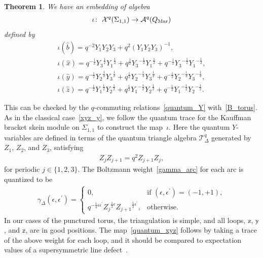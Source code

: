 \documentclass[10pt,a4paper]{amsart}
\numberwithin{equation}{section}
\newtheorem{Theorem}{Theorem}[section]
\begin{document}
\begin{Theorem} \label{thm:q_torus} We have an embedding of algebra
 \begin{gather*}
 \iota\colon \ \mathcal{X}^q(\Sigma_{1,1}) \to \mathcal{A}^q(Q_{\text{\rm Mar}})
 \end{gather*}
 defined by
 \begin{gather}
\iota(\hat{b}) = q^{-2} Y_1 Y_2 Y_3 + q^2 ( Y_1 Y_2 Y_3 )^{-1} ,\nonumber \\
 \iota(\hat{x}) = q^{-\frac{1}{2}} {Y_3}^{\frac{1}{2}} {Y_1}^{\frac{1}{2}} + q^{\frac{1}{2}} {Y_3}^{-\frac{1}{2}} {Y_1}^{\frac{1}{2}} + q^{-\frac{1}{2}} {Y_3}^{-\frac{1}{2}} {Y_1}^{-\frac{1}{2}} ,\nonumber \\
 \iota(\hat{y}) = q^{-\frac{1}{2}} {Y_2}^{\frac{1}{2}} {Y_3}^{\frac{1}{2}} + q^{\frac{1}{2}} {Y_2}^{-\frac{1}{2}} {Y_3}^{\frac{1}{2}} + q^{-\frac{1}{2}} {Y_2}^{-\frac{1}{2}} {Y_3}^{-\frac{1}{2}} ,\nonumber \\
 \iota(\hat{z}) = q^{-\frac{1}{2}} {Y_1}^{\frac{1}{2}} {Y_2}^{\frac{1}{2}} + q^{\frac{1}{2}} {Y_1}^{-\frac{1}{2}} {Y_2}^{\frac{1}{2}} + q^{-\frac{1}{2}} {Y_1}^{-\frac{1}{2}} {Y_2}^{-\frac{1}{2}} .\label{quantum_xyz}
 \end{gather}
\end{Theorem}

This can be checked by the $q$-commuting relations~\eqref{quantum_Y} with~\eqref{B_torus}. As in the classical case~\eqref{xyz_y}, we follow the quantum trace for the Kauffman bracket skein module on $\Sigma_{1,1}$ to construct the map~$\iota$. Here the quantum $Y$-variables are defined in terms of the quantum triangle algebra $\mathcal{T}^q_\Delta$ generated by $Z_1$, $Z_2$, and $Z_3$, satisfying
\begin{gather*}
 {Z}_j {Z}_{j+1} = q^2 {Z}_{j+1} {Z}_j ,
\end{gather*}
for periodic $j\in \{ 1, 2, 3 \}$. The Boltzmann weight~\eqref{gamma_arc} for each arc is quantized to be
\begin{gather*}
 \gamma_\Delta(\epsilon, \epsilon^\prime) =
 \begin{cases}
 0 , & \text{if $(\epsilon, \epsilon^\prime)=(-1, +1)$}, \\
 q^{-\frac{1}{4} \epsilon \epsilon^\prime} {Z_{ j}}^{\frac{1}{2}\epsilon} {Z_{ j+1}}^{\frac{1}{2}\epsilon^\prime}, & \text{otherwise}.
 \end{cases}
\end{gather*}
In our cases of the punctured torus, the triangulation is simple, and all loops, $\mathbb{x}$, $\mathbb{y}$, and $\mathbb{z}$, are in good positions. The map~\eqref{quantum_xyz} follows by taking a trace of the above weight for each loop, and it should be compared to expectation values of a supersymmetric line defect~\cite{GaioMoorNeit13a}.
\end{document}
